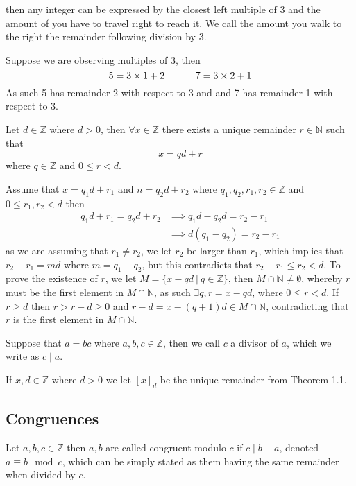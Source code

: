 then any integer can be expressed by the closest left multiple of 3 and the amount of you have to travel right to reach it.
We call the amount you walk to the right the remainder following division by 3.
\begin{exmp}
    Suppose we are observing multiples of 3, then
    \[
        5=3\times 1+2\hskip 32pt 7=3\times 2+1
    \]
    As such 5 has remainder 2 with respect to 3 and and 7 has remainder 1 with respect to 3.
\end{exmp}
\begin{theo}
    Let $d\in\mathbb{Z}$ where $d>0$, then $\forall x\in\mathbb{Z}$ there exists a unique remainder $r\in\mathbb{N}$ such that
    \[
        x=qd+r
    \]
    where $q\in\mathbb{Z}$ and $0\leq r<d$.
\end{theo}
\begin{prf}
    Assume that $x=q_{1}d+r_{1}$ and $n=q_{2}d+r_{2}$ where $q_{1},q_{2},r_{1},r_{2}\in\mathbb{Z}$ and $0\leq r_{1},r_{2}<d$ then
    \begin{align*}
        q_{1}d+r_{1}=q_{2}d+r_{2}&\implies q_{1}d-q_{2}d=r_{2}-r_{1} \\
                     &\implies d(q_{1}-q_{2})=r_{2}-r_{1}
    \end{align*}
    as we are assuming that $r_{1}\neq r_{2}$, we let $r_{2}$ be larger than $r_{1}$, which implies that $r_{2}-r_{1}=md$ where $m=q_{1}-q_{2}$, but this contradicts that $r_{2}-r_{1}\leq r_{2}<d$. To prove the existence of $r$, we let $M=\{x-qd~|~q\in\mathbb{Z}\}$, then $M\cap\mathbb{N}\neq\emptyset$, whereby $r$ must be the first element in $M\cap\mathbb{N}$, as such $\exists q,r=x-qd$, where $0\leq r<d$. If $r\geq d$ then $r>r-d\geq 0$ and $r-d=x-(q+1)d\in M\cap\mathbb{N}$, contradicting that $r$ is the first element in $M\cap\mathbb{N}$.
\end{prf}
\begin{defi}[Divisor]
    Suppose that $a=bc$ where $a,b,c\in\mathbb{Z}$, then we call $c$
    a divisor of $a$, which we write as $c\mid a$.
\end{defi}
\begin{defi}[Remainder]
    If $x,d\in\mathbb{Z}$ where $d>0$ we let $[x]_{d}$ be the unique remainder from Theorem 1.1.
\end{defi}
\pagebreak\subsection{Congruences}
\begin{defi}[Congruence]
    Let $a,b,c\in\mathbb{Z}$ then $a,b$ are called congruent modulo $c$ if $c\mid b-a$, denoted $a\equiv b\mod c$, which can be simply stated as them having the same remainder when divided by $c$.
\end{defi}
